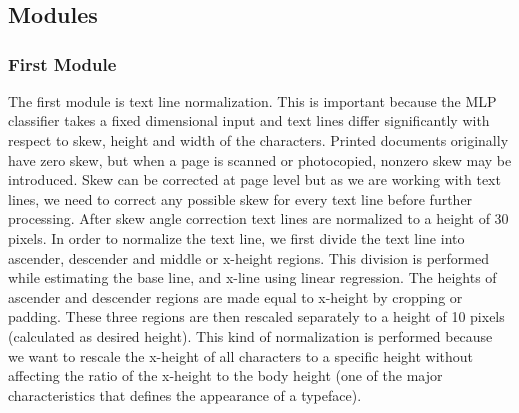 \appendix
\chapter{}
\section{Modules}
\subsection{First Module} 
The ﬁrst module is text line normalization. This is important because the MLP classiﬁer takes a ﬁxed dimensional input and text lines differ signiﬁcantly with respect to skew, height and width of the characters. Printed documents originally have zero skew, but when a page is scanned or photocopied, nonzero skew may be introduced. Skew can be corrected at page level but as we are working with text lines, we need to correct any possible skew for every text line before further processing. After skew angle correction text lines are normalized to a height of 30 pixels. In order to normalize the text line, we ﬁrst divide the text line into ascender, descender and middle or x-height regions. This division is performed while estimating the base line, and x-line using linear regression. The heights of ascender and descender regions are made equal to x-height by cropping or padding. These three regions are then rescaled separately to a height of 10 pixels (calculated as desired height). This kind of normalization is performed because we want to rescale the x-height of all characters to a speciﬁc height without affecting the ratio of the x-height to the body height (one of the major characteristics that deﬁnes the appearance of a typeface).\\

